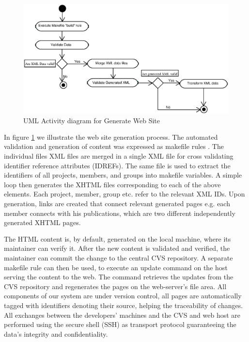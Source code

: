 \documentclass[10pt]{article}
\begin{document}
\begin{figure}[h!]
\includegraphics[scale=0.6]{generate-web-site}
\caption{UML Activity diagram for Generate Web Site}
\label{fig:generate-web-site}
\end{figure}

In figure \ref{fig:generate-web-site} we illustrate the web site generation process.
The automated validation and generation of content was
expressed as makefile rules \cite{OTT91}.
The individual files {\sc XML} files are merged in a
single {\sc XML} file for cross validating identifier
reference attributes ({\sc IDREFs}).
The same file is used to extract the identifiers of
all projects, members, and groups into makefile
variables.
A simple loop then generates the {\sc XHTML} files
corresponding to each of the above elements.
Each project, member, group etc. refer to the relevant {\sc XML IDs}.
Upon generation, links are created that
connect relevant generated pages e.g. each member connects with his publications, 
which are two different independently generated {\sc XHTML} pages.

The {\sc HTML} content is, by default, generated on the
local machine, where its maintainer can verify it.
After the new content is validated and verified,
the maintainer can commit the change to the central {\sc CVS} repository. 
A separate makefile rule can then be used,
to execute an update command on the
host serving the content to the web.
The command retrieves the updates from the {\sc CVS}
repository and regenerates the pages on the web-server's
file area.
All components of our system are under version control,
all pages are automatically tagged with identifiers
denoting their source, helping the traceability of changes.
All exchanges between the developers' machines and the
{\sc CVS} and web host are performed using the secure
shell ({\sc SSH}) as transport protocol guaranteeing the data's integrity
and confidentiality.
\end{document}
